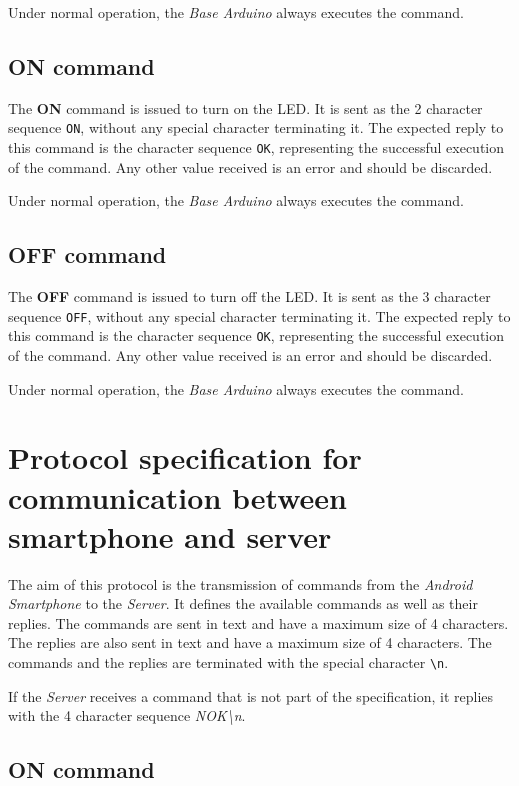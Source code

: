\documentclass[conference, a4paper]{IEEEtran}
\begin{document}
Under normal operation, the \textit{Base Arduino} always executes the command.

\subsection{ON command}

The \textbf{ON} command is issued to turn on the LED. It is sent as the 2 character sequence \texttt{ON}, without any special character terminating it. The expected reply to this command is the character sequence \texttt{OK}, representing the successful execution of the command. Any other value received is an error and should be discarded.

Under normal operation, the \textit{Base Arduino} always executes the command.

\subsection{OFF command}

The \textbf{OFF} command is issued to turn off the LED. It is sent as the 3 character sequence \texttt{OFF}, without any special character terminating it. The expected reply to this command is the character sequence \texttt{OK}, representing the successful execution of the command. Any other value received is an error and should be discarded.

Under normal operation, the \textit{Base Arduino} always executes the command.

\section{Protocol specification for communication between smartphone and server}
\label{prot_smart}

The aim of this protocol is the transmission of commands from the \textit{Android Smartphone} to the \textit{Server}. It defines the available commands as well as their replies. The commands are sent in text and have a maximum size of 4 characters. The replies are also sent in text and have a maximum size of 4 characters. The commands and the replies are terminated with the special character \texttt{\textbackslash n}.

If the \textit{Server} receives a command that is not part of the specification, it replies with the 4 character sequence \textit{NOK\textbackslash n}.

\subsection{ON command}
\end{document}
